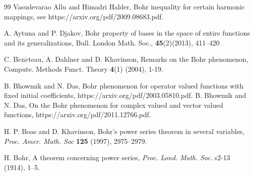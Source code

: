 \documentclass[a4paper,12pt]{amsart}
\theoremstyle{plain}
\theoremstyle{definition}
\begin{document}
\begin{thebibliography}{99}
	  {\sc Vasudevarao Allu} and {\sc Himadri Halder}, Bohr inequality for certain harmonic mappings, see https://arxiv.org/pdf/2009.08683.pdf. 
	
	
	 {\sc A. Aytuna} and {\sc P. Djakov}, Bohr property of bases in the space of entire functions and its generalizations, Bull. London Math. Soc., \textbf{45}(2)(2013), 411--420
	
	 {\sc C. B$ \acute{e} $n$ \acute{e} $teau}, {\sc A. Dahlner} and {\sc D. Khavinson}, Remarks on the Bohr phenomenon, Compute. Methods Funct. Theory \textbf{4}(1) (2004), 1-19.
	
	 {\sc B. Bhowmik} and {\sc N. Das}, Bohr phenomenon for operator valued functions with fixed initial coefficients, https://arxiv.org/pdf/2003.05810.pdf.
	 {\sc B. Bhowmik} and {\sc N. Das}, On the Bohr phenomenon for complex valued and vector valued functions, https://arxiv.org/pdf/2011.12766.pdf.
	
	 {\sc H. P. Boas} and {\sc D. Khavinson}, Bohr's power series theorem in several variables, {\it Proc. Amer. Math. Soc}  {\bf 125} (1997), 2975--2979.
	
	
	 {\sc H. Bohr}, A theorem concerning power series,  {\it Proc. Lond. Math. Soc}. s2-13 (1914), 1--5.
	
	
	

\end{thebibliography}
\end{document}
